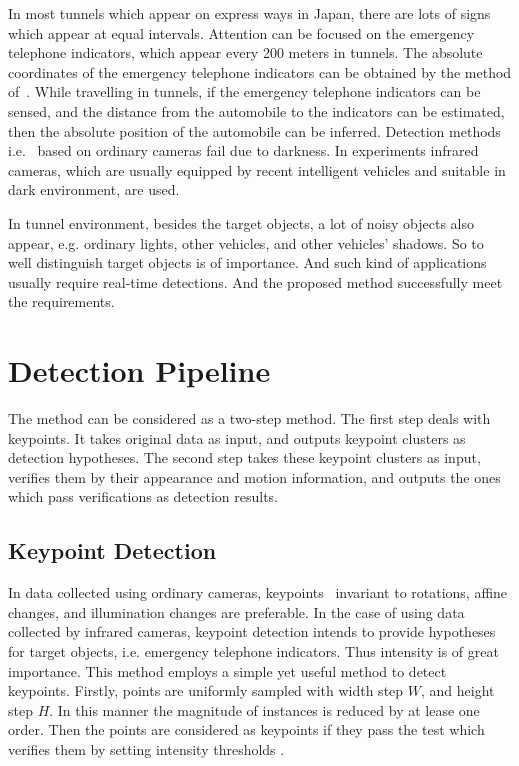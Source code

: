 In most tunnels which appear on express ways in Japan, there are lots of signs which appear at equal intervals. Attention can be focused on the emergency telephone indicators, which appear every 200 meters in tunnels. The absolute coordinates of the emergency telephone indicators can be obtained by the method of~\cite{xue}. While travelling in tunnels, if the emergency telephone indicators can be sensed, and the distance from the automobile to the indicators can be estimated, then the absolute position of the automobile can be inferred. Detection methods i.e.~\cite{ac23} based on ordinary cameras fail due to darkness. In experiments infrared cameras, which are usually equipped by recent intelligent vehicles and  suitable in dark environment, are used.

 In tunnel environment, besides the target objects, a lot of noisy objects also appear, e.g. ordinary lights, other vehicles, and other vehicles' shadows. So to well distinguish target objects is of importance. And such kind of applications usually require real-time detections. And the proposed method successfully meet the requirements.

\section{Detection Pipeline}
\label{pip}
The method can be considered as a two-step method. The first step deals with keypoints. It
takes original data as input, and outputs keypoint clusters as detection hypotheses. The second
step takes these keypoint clusters as input, verifies them by their appearance and motion
information, and outputs the ones which pass verifications as detection results.

\subsection{Keypoint Detection}
In data collected using ordinary cameras, keypoints~\cite{o2,o12} invariant to rotations, affine changes, and illumination changes are preferable. In the case of using data collected by infrared cameras, keypoint detection intends to provide hypotheses for target objects, i.e. emergency telephone indicators. Thus intensity is of great importance. This method employs a simple yet useful method to detect keypoints. Firstly, points are uniformly sampled with width step $W$, and height step $H$. In this manner the magnitude of instances is reduced by  at lease one order. Then the points are considered as keypoints if they pass the test which verifies them by setting intensity thresholds .

